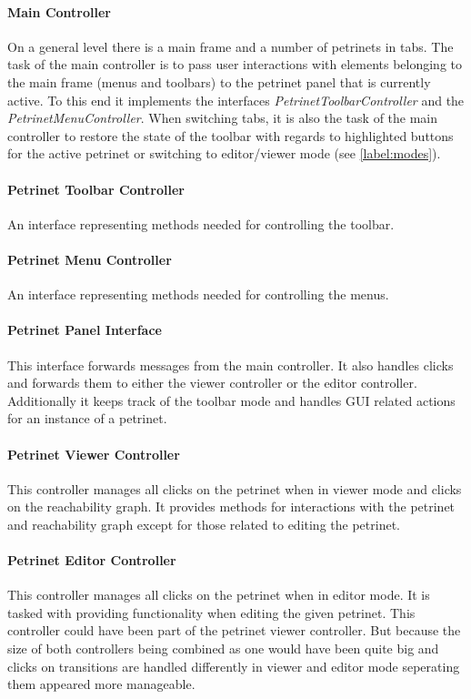 \documentclass[10pt, a4paper]{article}
\begin{document}
\paragraph{Main Controller} On a general level there is a main frame and a number of petrinets in tabs. The task of the main controller is to pass user interactions with elements belonging to the main frame (menus and toolbars) to the petrinet panel that is currently active. To this end it implements the interfaces \textit{PetrinetToolbarController} and the \textit{PetrinetMenuController}. When switching tabs, it is also the task of the main controller to restore the state of the toolbar with regards to highlighted buttons for the active petrinet or switching to editor/viewer mode (see \ref{label:modes}). 

\paragraph{Petrinet Toolbar Controller} An interface representing methods needed for controlling the toolbar.

\paragraph{Petrinet Menu Controller} An interface representing methods needed for controlling the menus.

\paragraph{Petrinet Panel Interface} This interface forwards messages from the main controller. It also handles clicks and forwards them to either the viewer controller or the editor controller. Additionally it keeps track of the toolbar mode and handles GUI related actions for an instance of a petrinet. 

\paragraph{Petrinet Viewer Controller} This controller manages all clicks on the petrinet when in viewer mode and clicks on the reachability graph. It provides methods for interactions with the petrinet and reachability graph except for those related to editing the petrinet.  

\paragraph{Petrinet Editor Controller} This controller manages all clicks on the petrinet when in editor mode. It is tasked with providing functionality when editing the given petrinet. This controller could have been part of the petrinet viewer controller. But because the size of both controllers being combined as one would have been quite big and clicks on transitions are handled differently in viewer and editor mode seperating them appeared more manageable.
\end{document}
